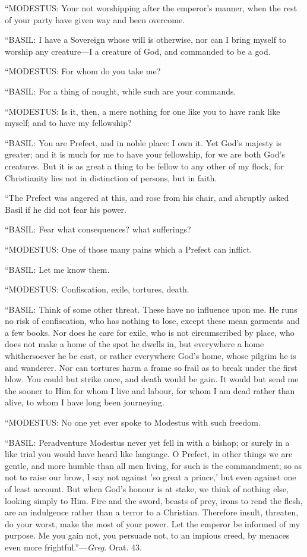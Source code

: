 ``MODESTUS: Your not worshipping after the emperor's manner,
when the rest of your party have given way and been overcome.

``BASIL: I have a Sovereign whose will is otherwise, nor can I
bring myself to worship any creature—I a
creature of God, and commanded to be a god.

``MODESTUS: For whom do you take me?

``BASIL: For a thing of nought, while such are your commands.

``MODESTUS: Is it, then, a mere nothing for one like you to
have rank like myself; and to have my fellowship?

``BASIL: You are Prefect, and in noble place: I own it. Yet God's
majesty is greater; and it is much for me to have your fellowship, for
we are both God's creatures. But it is as great a thing to be fellow
to any other of my flock, for Christianity lies not in distinction of
persons, but in faith.

``The Prefect was angered at this, and rose from his chair, and
abruptly asked Basil if he did not fear his power.

``BASIL: Fear what consequences? what sufferings?

``MODESTUS: One of those many pains which a Prefect can
inflict.

``BASIL: Let me know them.

``MODESTUS: Confiscation, exile, tortures, death.

``BASIL: Think of some other threat. These have no influence
upon me. He runs no risk of confiscation, who has nothing to lose,
except these mean garments and a few books. Nor does he care for
exile, who is not circumscribed by place, who does not make a home of
the spot he dwells in, but everywhere a home whithersoever he be cast,
or rather everywhere God's home, whose pilgrim he is and wanderer. Nor
can tortures harm a frame so frail as to break under the first blow.
You could but strike once, and death would be gain. It would but send
me the sooner to Him for whom I live and labour, for whom I am dead
rather than alive, to whom I have long been journeying.

``MODESTUS: No one yet ever spoke to Modestus with such
freedom.

``BASIL: Peradventure Modestus never yet fell in with a bishop;
or surely in a like trial you would have heard like language. O
Prefect, in other things we are gentle, and more humble than all men
living, for such is the commandment; so as not to raise our brow, I
say not against 'so great a prince,' but even against one of least
account. But when God's honour is at stake, we think of nothing else,
looking simply to Him. Fire and the sword, beasts of prey, irons to
rend the flesh, are an indulgence rather than a terror to a Christian.
Therefore insult, threaten, do your worst, make the most of your
power. Let the emperor be informed of my purpose.
Me you gain not, you persuade not, to an impious creed, by menaces
even more frightful.''—\emph{Greg}. Orat. 43.

